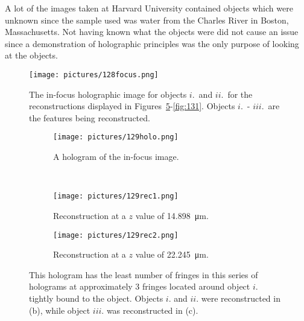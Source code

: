 A lot of the images taken at Harvard University 
contained objects which were
unknown since the sample used was water from the Charles River in Boston,
Massachusetts. Not
having known what the objects were did not cause an issue since
a demonstration of holographic principles was the only purpose of looking at the objects.


\begin{figure}
    \begin{center}
        \texttt{[image: pictures/128focus.png]}
        \caption{The in-focus holographic image for objects $i.$\ and  $ii.$\
            for the reconstructions
            displayed in Figures~\ref{fig:129}-\ref{fig:131}.
    Objects $i.$\ - $iii.$\ are the features being reconstructed. }
        \label{fig:128focus}
    \end{center}
\end{figure}


\begin{figure}[ht!]
    \begin{center}

        \begin{subfigure}[t]{0.4\textwidth}
            \label{fig:129holo}
            \texttt{[image: pictures/129holo.png]}
            \caption{A hologram of the in-focus image.}
        \end{subfigure}
        \\
        \begin{subfigure}[t]{0.4\textwidth}
            \label{fig:129rec1}
            \texttt{[image: pictures/129rec1.png]}
            \caption{Reconstruction at a $z$ value of \SI{14.898}{\micro\meter}.}
        \end{subfigure}
                \hspace*{\fill}
%
        \begin{subfigure}[t]{0.4\textwidth}
            \label{fig:129rec2}
            \texttt{[image: pictures/129rec2.png]}
            \caption{Reconstruction at a $z$ value of \SI{22.245}{\micro\meter}.}
        \end{subfigure}


    \end{center}
    \caption{%
        This hologram has the least number of fringes in this series of
        holograms at approximately 3 fringes located around object $i.$ tightly
        bound to the object. 
        Objects $i.$ and $ii.$ were reconstructed in (b),
        while object $iii.$ was reconstructed in (c).
    }%
    \label{fig:129}
\end{figure}


